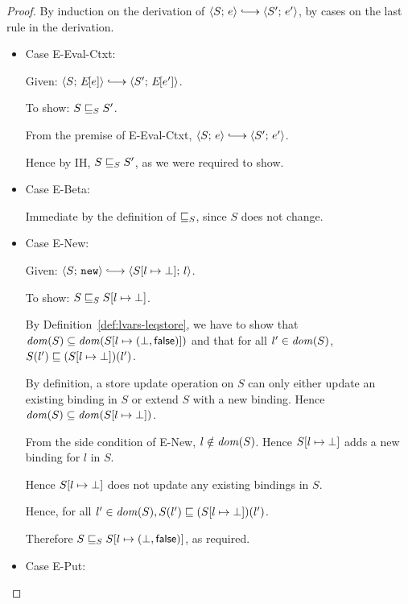 \begin{proof}
  By induction on the derivation of $\config{S}{e} \parstepsto
  \config{S'}{e'}$, by cases on the last rule in the derivation.

  \begin{itemize}

    \item Case {\sc E-Eval-Ctxt}:

      Given: $\config{S}{\E{e}} \parstepsto \config{S'}{\E{e'}}$.

      To show: $S \sqsubseteq_S S'$.

      From the premise of {\sc E-Eval-Ctxt}, $\config{S}{e}
      \parstepsto \config{S'}{e'}$.

      Hence by IH, $S \sqsubseteq_S S'$, as we were required to show.

    \item Case {\sc E-Beta}:

      Immediate by the definition of $ \sqsubseteq_S $, since $S$ does
      not change.

    \item Case {\sc E-New}:

      Given: $\config{S}{\NEW} \parstepsto
      \config{\extSRaw{S}{l}{\bot}}{l}$.

      To show: $S \sqsubseteq_S S[l \mapsto \bot]$.

      By Definition~\ref{def:lvars-leqstore}, we have to show that
      $\mathit{dom}(S) \subseteq \mathit{dom}(S[l \mapsto (\bot, \textsf{false})])$ and
      that for all $l' \in \mathit{dom}(S)$, $S(l') \sqsubseteq
      (S[l \mapsto \bot])(l')$.

      By definition, a store update operation on $S$ can only either
      update an existing binding in $S$ or extend $S$ with a new
      binding.  Hence $\mathit{dom}(S) \subseteq \mathit{dom}(S[l \mapsto \bot])$.

      From the side condition of {\sc E-New}, $l \notin \mathit{dom}(S)$.
      Hence $S[l \mapsto \bot]$ adds a new binding for $l$ in $S$.

      Hence $S[l \mapsto \bot]$ does not update any existing
      bindings in $S$.

      Hence, for all $l' \in \mathit{dom}(S), S(l') \sqsubseteq
      (S[l \mapsto \bot])(l')$.

      Therefore $S \sqsubseteq_S S[l \mapsto (\bot, \textsf{false})]$, as
      required.

    \item Case {\sc E-Put}:


\end{itemize}
\end{proof}
